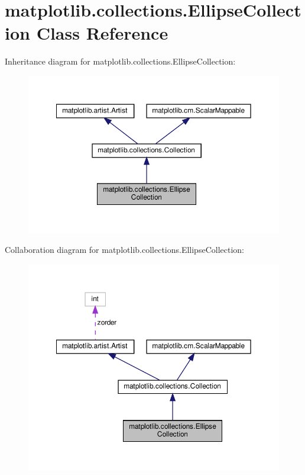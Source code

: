 \hypertarget{classmatplotlib_1_1collections_1_1EllipseCollection}{}\section{matplotlib.\+collections.\+Ellipse\+Collection Class Reference}
\label{classmatplotlib_1_1collections_1_1EllipseCollection}


Inheritance diagram for matplotlib.\+collections.\+Ellipse\+Collection\+:
\nopagebreak
\begin{figure}[H]
\begin{center}
\leavevmode
\includegraphics[width=350pt]{classmatplotlib_1_1collections_1_1EllipseCollection__inherit__graph}
\end{center}
\end{figure}


Collaboration diagram for matplotlib.\+collections.\+Ellipse\+Collection\+:
\nopagebreak
\begin{figure}[H]
\begin{center}
\leavevmode
\includegraphics[width=350pt]{classmatplotlib_1_1collections_1_1EllipseCollection__coll__graph}
\end{center}
\end{figure}
